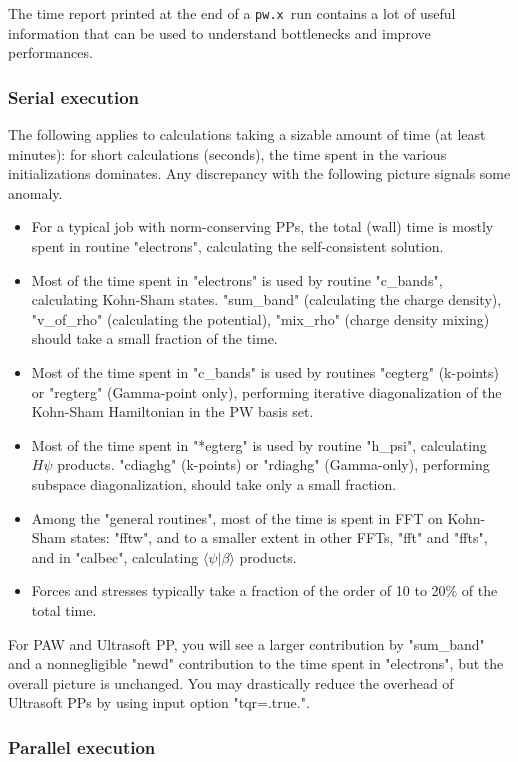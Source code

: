 \documentclass[12pt,a4paper]{article}
\def\pwx{\texttt{pw.x}}
\begin{document}
The time report printed at the end of a \pwx\ run contains a lot of useful 
information that can be used to understand bottlenecks and improve 
performances.

\subsubsection{Serial execution}
The following applies to calculations taking a sizable amount of time
(at least minutes): for short calculations (seconds), the time spent in 
the various initializations dominates. Any discrepancy with the following
picture signals some anomaly.

\begin{itemize}
\item
  For a typical job with norm-conserving PPs, the total (wall) time is mostly 
  spent in routine "electrons", calculating the self-consistent solution. 
\item
  Most of the time spent in "electrons" is used by routine "c\_bands", 
  calculating Kohn-Sham states. "sum\_band" (calculating the charge density),
  "v\_of\_rho" (calculating the potential), "mix\_rho" (charge density mixing)
  should take a small fraction of the time.
\item
  Most of the time spent in "c\_bands" is used by routines "cegterg" (k-points)
  or "regterg" (Gamma-point only), performing iterative diagonalization of
  the Kohn-Sham Hamiltonian in the PW basis set. 
\item
  Most of the time spent in "*egterg" is used by routine "h\_psi",
  calculating $H\psi$ products. "cdiaghg" (k-points) or "rdiaghg" (Gamma-only), 
  performing subspace diagonalization, should take only a small fraction.
\item
  Among the "general routines", most of the time is spent in FFT on Kohn-Sham
  states: "fftw", and to a smaller extent in other FFTs, "fft" and "ffts", 
  and in "calbec", calculating $\langle\psi|\beta\rangle$ products. 
\item
  Forces and stresses typically take a fraction of the order of 10 to 20\%
  of the total time.
\end{itemize}
For PAW and Ultrasoft PP, you will see a larger contribution by "sum\_band" 
and a nonnegligible "newd" contribution to the time spent in "electrons", 
but the overall picture is unchanged. You may drastically reduce the
overhead of Ultrasoft PPs by using input option "tqr=.true.".

\subsubsection{Parallel execution}
\end{document}
